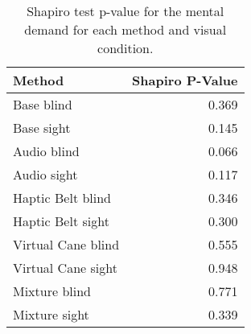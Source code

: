 
\begin{table}[!htb]
\centering
\caption{Shapiro test p-value for the mental demand for each method and visual condition.}
\label{tab:shapiro_mental_demand}
\begin{tabular}{lr}
\toprule
            Method &  Shapiro P-Value \\
\midrule
        Base blind &            0.369 \\
        Base sight &            0.145 \\
       Audio blind &            0.066 \\
       Audio sight &            0.117 \\
 Haptic Belt blind &            0.346 \\
 Haptic Belt sight &            0.300 \\
Virtual Cane blind &            0.555 \\
Virtual Cane sight &            0.948 \\
     Mixture blind &            0.771 \\
     Mixture sight &            0.339 \\
\bottomrule
\end{tabular}
\end{table}

